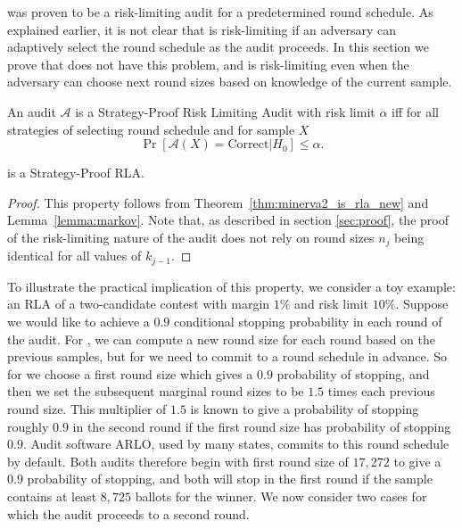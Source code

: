 

\Minerva was proven to be a risk-limiting audit for a predetermined round schedule.
As explained earlier, it is not clear that \Minerva is risk-limiting if an adversary can 
adaptively select the round schedule as the audit proceeds. In this section we prove that \Providence does not have this problem, and is risk-limiting even when the adversary can choose next round sizes based on knowledge of the current sample. 

\begin{definition}
 An audit $\mathcal{A}$ is a Strategy-Proof Risk Limiting Audit with risk limit $\alpha$ iff for
 all strategies of selecting round schedule and for sample $X$ 
 \[
  \Pr\left[\mathcal{A}(X) = \text{Correct} | H_0\right] \leq \alpha.
 \]

\end{definition}

\begin{lemma}
\Providence is a Strategy-Proof RLA. 
\end{lemma}
\begin{proof}
This property follows from Theorem~\ref{thm:minerva2_is_rla_new} and Lemma~\ref{lemma:markov}. Note that, as described in section \ref{sec:proof}, the proof of the risk-limiting nature of the audit does not rely on round sizes $n_j$ being identical for all values of $k_{j-1}$. 
\end{proof}

To illustrate the practical implication of this property, we consider a toy example: an RLA of a two-candidate contest with margin $1\%$ and risk limit $10\%$. 
Suppose we would like to achieve a $0.9$ conditional stopping probability in each round of the audit. For \Providence, we can compute a new round size for each round based on the previous samples, but for \Minerva we need to commit to a round schedule in advance. So for \Minerva we choose a first round size which gives a $0.9$ probability of stopping, and then we set the subsequent marginal round sizes to be $1.5$ times each previous round size. This multiplier of $1.5$ is known to give a probability of stopping roughly $0.9$ in the second round if the first round size has probability of stopping $0.9$. Audit software ARLO, used by many states, commits to this round schedule by default. Both audits therefore begin with first round size of $17,272$ to give a $0.9$ probability of stopping, and both will stop in the first round if the sample contains at least $8,725$ ballots for the winner. We now consider two cases for which the audit proceeds to a second round. 

